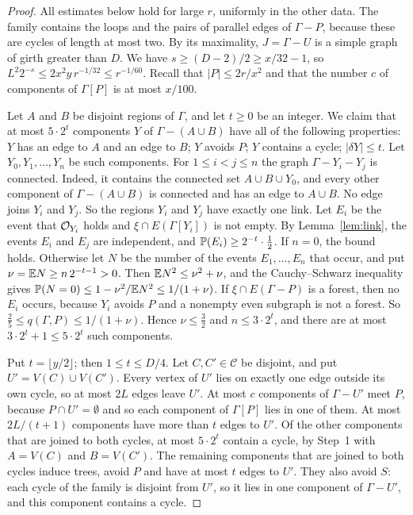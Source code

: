 \begin{proof}
All estimates below hold for large $r$, uniformly in the other data. The family contains the
loops and the pairs of parallel edges of $\Gamma-P$, because these are cycles of length at most
two. By its maximality, $J=\Gamma-U$ is a simple graph of girth greater than $D$. We have
$s\ge(D-2)/2\ge x/32-1$, so $L^{2}2^{-s}\le2x^{2}y\,r^{-1/32}\le r^{-1/60}$. Recall that
$|P|\le2r/x^{2}$ and that the number $c$ of components of $\Gamma[P]$ is at most $x/100$.

 Let $A$ and $B$ be disjoint regions of $\Gamma$, and let
$t\ge0$ be an integer. We claim that at most $5\cdot2^{t}$ components $Y$ of $\Gamma-(A\cup B)$
have all of the following properties: $Y$ has an edge to $A$ and an edge to $B$; $Y$ avoids $P$;
$Y$ contains a cycle; $|\delta Y|\le t$. Let $Y_0,Y_1,\dots,Y_n$ be such components. For
$1\le i<j\le n$ the graph $\Gamma-Y_i-Y_j$ is connected. Indeed, it contains the connected set
$A\cup B\cup Y_0$, and every other component of $\Gamma-(A\cup B)$ is connected and has an edge to
$A\cup B$. No edge joins $Y_i$ and $Y_j$. So the regions $Y_i$ and $Y_j$ have exactly one link.
Let $E_i$ be the event that $\mathcal{O}_{Y_i}$ holds and $\xi\cap E(\Gamma[Y_i])$ is not empty. By
Lemma~\ref{lem:link}, the events $E_i$ and $E_j$ are independent, and
$\mathbb{P}(E_i)\ge2^{-t}\cdot\tfrac12$. If $n=0$, the bound holds. Otherwise let $N$ be the number of the
events $E_1,\dots,E_n$ that occur, and put $\nu=\mathbb{E} N\ge n\,2^{-t-1}>0$. Then
$\mathbb{E} N^{2}\le\nu^{2}+\nu$, and the Cauchy--Schwarz inequality gives
$\mathbb{P}(N=0)\le1-\nu^{2}/\mathbb{E} N^{2}\le1/(1+\nu)$. If $\xi\cap E(\Gamma-P)$ is a forest, then no $E_i$
occurs, because $Y_i$ avoids $P$ and a nonempty even subgraph is not a forest. So
$\frac25\le q(\Gamma,P)\le1/(1+\nu)$. Hence $\nu\le\frac32$ and $n\le3\cdot2^{t}$, and there are
at most $3\cdot2^{t}+1\le5\cdot2^{t}$ such components.

 Put $t=\lfloor y/2\rfloor$; then $1\le t\le D/4$. Let
$C,C'\in\mathcal C$ be disjoint, and put $U'=V(C)\cup V(C')$. Every vertex of $U'$ lies on exactly
one edge outside its own cycle, so at most $2L$ edges leave $U'$. At most $c$ components of
$\Gamma-U'$ meet $P$, because $P\cap U'=\emptyset$ and so each component of $\Gamma[P]$ lies in one
of them. At most $2L/(t+1)$ components have more than $t$ edges to $U'$. Of the other components
that are joined to both cycles, at most $5\cdot2^{t}$ contain a cycle, by Step~1 with $A=V(C)$
and $B=V(C')$. The remaining components that are joined to both cycles induce trees, avoid $P$
and have at most $t$ edges to $U'$. They also avoid $S$: each cycle of the family is disjoint
from $U'$, so it lies in one component of $\Gamma-U'$, and this component contains a cycle.


\end{proof}
